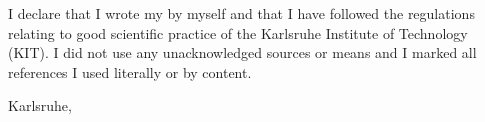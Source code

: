 \vspace{0.25cm}

I declare that I wrote my \artderarbeit{} by myself and that I have followed the regulations relating to good scientific practice of the Karlsruhe Institute of Technology (KIT). I did not use any unacknowledged sources or means and I marked all references I used literally or by content.

\vspace{0.5cm}

Karlsruhe, \abgabe

\vspace{1.4cm}

\student\addWithPreCommaSpace{\studentgrad}
\rmfamily
